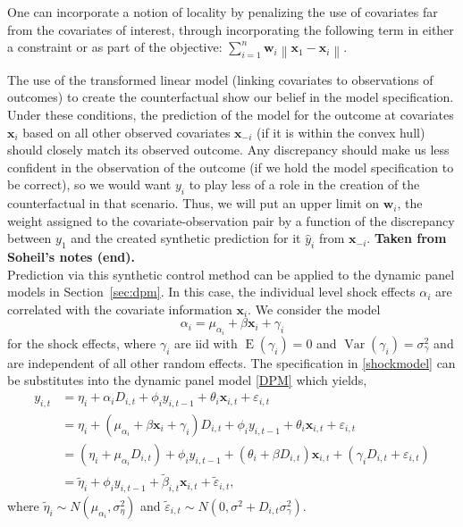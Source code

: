 \documentclass[11pt]{article}
\newcommand{\w}{\textbf{w}}
\newcommand{\x}{\textbf{x}}
\newcommand{\norm}[1]{\left\lVert#1\right\rVert}
\DeclareMathOperator{\E}{E}
\DeclareMathOperator{\Var}{Var}
\begin{document}
One can incorporate a notion of locality by penalizing the use of covariates 
far from the covariates of interest, through incorporating the following term 
in either a constraint or as part of the objective:
$\sum_{i=1}^n \w_i \norm{\x_1 - \x_i}$.

The use of the transformed linear model (linking covariates to observations of 
outcomes) to create the counterfactual show our belief in the model 
specification. Under these conditions, the prediction of the model for the 
outcome at covariates $\x_i$ based on all other observed covariates $\x_{-i}$ 
(if it is within the convex hull) should closely match its observed outcome.  
Any discrepancy should make us less confident in the observation of the 
outcome (if we hold the model specification to be correct), so we would want 
$y_i$ to play less of a role in the creation of the counterfactual in that 
scenario.  Thus, we will put an upper limit on $\w_i$, the weight assigned to 
the covariate-observation pair by a function of the discrepancy between $y_1$ 
and the created synthetic prediction for it $\hat{y}_i$ from $\x_{-i}$.  
{\bf Taken from Soheil's notes (end).} \\


Prediction via this synthetic control method can be applied to the dynamic 
panel models in Section~\ref{sec:dpm}.  In this case, the individual level 
shock effects $\alpha_i$ are correlated with the covariate information 
$\x_i$.  We consider the model 
\begin{equation} \label{shockmodel}
  \alpha_{i} = \mu_{\alpha_i} + \beta\x_i + \gamma_{i}
\end{equation}
for the shock effects, where $\gamma_{i}$ are iid with 
$\E(\gamma_i) = 0$ and $\Var(\gamma_i) = \sigma^2_\gamma$ and are 
independent of all other random effects.  
The specification in \eqref{shockmodel} can be substitutes into the dynamic 
panel model \eqref{DPM} which yields,
\begin{align*} 
  y_{i,t} &= \eta_i + \alpha_iD_{i,t} + \phi_i y_{i,t-1} + \theta_i \x_{i,t} 
    + \varepsilon_{i,t} \\
  &= \eta_i + (\mu_{\alpha_i} + \beta\x_i + \gamma_{i})D_{i,t} 
    + \phi_i y_{i,t-1} + \theta_i \x_{i,t} + \varepsilon_{i,t} \\
  &= (\eta_i + \mu_{\alpha_i}D_{i,t}) + \phi_i y_{i,t-1} 
    + (\theta_i + \beta D_{i,t})\x_{i,t} + (\gamma_{i}D_{i,t} 
    + \varepsilon_{i,t}) \\
  &= \tilde\eta_i + \phi_i y_{i,t-1} + \tilde\beta_{i,t}\x_{i,t} + \tilde\varepsilon_{i,t},
\end{align*}
where $\tilde\eta_i \sim N(\mu_{\alpha_i},\sigma^2_\eta)$ 
and $\tilde\varepsilon_{i,t} \sim N(0, \sigma^2 + D_{i,t}\sigma^2_\gamma)$.
\end{document}
